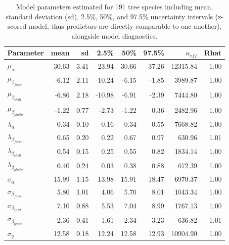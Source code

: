 \documentclass[11pt]{article}
\begin{document}
\clearpage



\begin{table}[ht]
\centering
\caption{Model parameters estimated for 191 tree species including mean, standard deviation (sd), 2.5\%, 50\%, and 97.5\% uncertainty intervals (z-scored model, thus predictors are directly comparable to one another), alongside model diagnostics.} 
\label{tab:modelanglamb}
\begingroup\footnotesize
\begin{tabular}{lrrrrrrr}
  \hline
Parameter & mean & sd & 2.5\% & 50\% & 97.5\% & $n_{eff}$ & Rhat \\ 
  \hline
$\mu_{\alpha}$ & 30.63 & 3.41 & 23.94 & 30.66 & 37.26 & 12315.84 & 1.00 \\ 
  $\mu_{\beta_{force}}$ & -6.12 & 2.11 & -10.24 & -6.15 & -1.85 & 3989.87 & 1.00 \\ 
  $\mu_{\beta_{chill}}$ & -6.86 & 2.18 & -10.98 & -6.91 & -2.39 & 7444.80 & 1.00 \\ 
  $\mu_{\beta_{photo}}$ & -1.22 & 0.77 & -2.73 & -1.22 & 0.36 & 2482.96 & 1.00 \\ 
  $\lambda_{\alpha}$ & 0.34 & 0.10 & 0.16 & 0.34 & 0.55 & 7668.82 & 1.00 \\ 
  $\lambda_{\beta_{force}}$ & 0.65 & 0.20 & 0.22 & 0.67 & 0.97 & 630.96 & 1.01 \\ 
  $\lambda_{\beta_{chill}}$ & 0.54 & 0.15 & 0.25 & 0.55 & 0.82 & 1834.14 & 1.00 \\ 
  $\lambda_{\beta_{photo}}$ & 0.40 & 0.24 & 0.03 & 0.38 & 0.88 & 672.39 & 1.00 \\ 
  $\sigma_{\alpha}$ & 15.99 & 1.15 & 13.98 & 15.91 & 18.47 & 6970.37 & 1.00 \\ 
  $\sigma_{\beta_{force}}$ & 5.80 & 1.01 & 4.06 & 5.70 & 8.01 & 1043.34 & 1.00 \\ 
  $\sigma_{\beta_{chill}}$ & 7.10 & 0.88 & 5.53 & 7.04 & 8.99 & 1767.13 & 1.00 \\ 
  $\sigma_{\beta_{photo}}$ & 2.36 & 0.41 & 1.61 & 2.34 & 3.23 & 636.82 & 1.01 \\ 
  $\sigma_y$ & 12.58 & 0.18 & 12.24 & 12.58 & 12.93 & 10904.90 & 1.00 \\ 
   \hline
\end{tabular}
\endgroup
\end{table} \clearpage \pagebreak 
\end{document}
